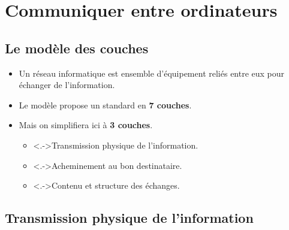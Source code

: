 \section[Communiquer]{Communiquer entre ordinateurs} %



\subsection{Le modèle des couches}
\begin{slide}
	\begin{itemize}
		\item Un réseau informatique est ensemble d'équipement reliés entre eux pour échanger de l'information.
		\item Le modèle \textbf{} propose un standard en \textbf{7 couches}.
		\item Mais on simplifiera ici à \textbf{3 couches}. %
		\begin{itemize}
			\item<.->Transmission physique de l'information.
			\item<.->Acheminement au bon destinataire.
			\item<.->Contenu et structure des échanges.
		\end{itemize}		
	\end{itemize}
\end{slide}
\subsection{Transmission physique de l'information}

